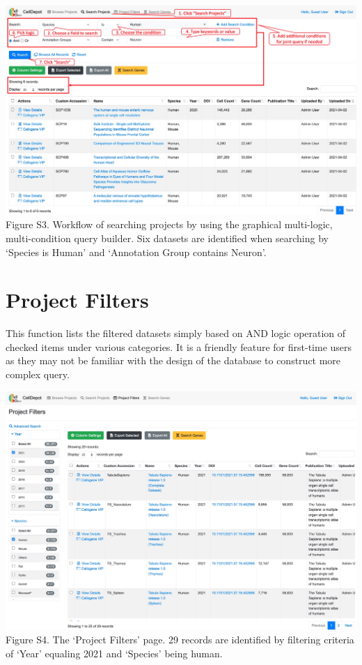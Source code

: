 \documentclass[
  openany]{book}
\begin{document}
\href{figures/S3.jpg}{\includegraphics{figures/S3.jpg}}
Figure S3. Workflow of searching projects by using the graphical multi-logic, multi-condition query builder. Six datasets are identified when searching by `Species is Human' and `Annotation Group contains Neuron'.

\hypertarget{project-filters}{%
\section{Project Filters}\label{project-filters}}

This function lists the filtered datasets simply based on AND logic operation of checked items under various categories. It is a friendly feature for first-time users as they may not be familiar with the design of the database to construct more complex query.

\href{figures/S4.jpg}{\includegraphics{figures/S4.jpg}}
Figure S4. The `Project Filters' page. 29 records are identified by filtering criteria of `Year' equaling 2021 and `Species' being human.
\end{document}
